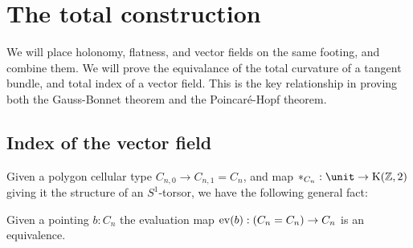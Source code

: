 \section{The total construction}
We will place holonomy, flatness, and vector fields on the same footing, and combine them. We will prove the equivalance of the total curvature of a tangent bundle, and total index of a vector field. This is the key relationship in proving both the Gauss-Bonnet theorem and the Poincaré-Hopf theorem.

\subsection{Index of the vector field}
Given a polygon cellular type \( C_{n,0}\to C_{n,1}=C_n \), and map \( *_{C_n}:\unit\to\Kzt \) giving it the structure of an \( S^1 \)-torsor, we have the following general fact:
\begin{myprop}
\label{prop:eveq}
Given a pointing \( b:C_n \) the evaluation map \( \mathrm{ev}(b):(C_n=C_n)\to C_n \) is an equivalence.
\end{myprop}

